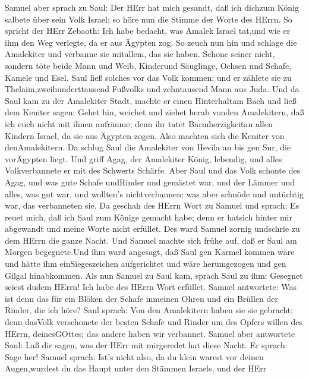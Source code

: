  Samuel aber sprach zu Saul: Der HErr hat mich gesandt, daß
ich dichzum König salbete über sein Volk Israel; so höre nun die Stimme
der Worte des HErrn.  So spricht der HErr Zebaoth: Ich habe
bedacht, was Amalek Israel tat,und wie er ihm den Weg verlegte, da er
aus Ägypten zog.  So zeuch nun hin und schlage die
Amalekiter und verbanne sie mitallem, das sie haben. Schone seiner
nicht, sondern töte beide Mann und Weib, Kinderund Säuglinge, Ochsen und
Schafe, Kamele und Esel.  Saul ließ solches vor das Volk
kommen; und er zählete sie zu Thelaim,zweihunderttausend Fußvolks und
zehntausend Mann aus Juda.  Und da Saul kam zu der
Amalekiter Stadt, machte er einen Hinterhaltam Bach  und
ließ dem Keniter sagen: Gehet hin, weichet und ziehet herab vonden
Amalekitern, daß ich euch nicht mit ihnen aufräume; denn ihr tatet
Barmherzigkeitan allen Kindern Israel, da sie aus Ägypten zogen. Also
machten sich die Keniter von denAmalekitern.  Da schlug Saul
die Amalekiter von Hevila an bis gen Sur, die vorÄgypten liegt.
 Und griff Agag, der Amalekiter König, lebendig, und alles
Volkverbannete er mit des Schwerts Schärfe.  Aber Saul und
das Volk schonte des Agag, und was gute Schafe undRinder und gemästet
war, und der Lämmer und alles, was gut war, und wollten's
nichtverbannen; was aber schnöde und untüchtig war, das verbanneten sie.
 Da geschah des HErrn Wort zu Samuel und sprach:
 Es reuet mich, daß ich Saul zum Könige gemacht habe; denn
er hatsich hinter mir abgewandt und meine Worte nicht erfüllet. Des ward
Samuel zornig undschrie zu dem HErrn die ganze Nacht.  Und
Samuel machte sich frühe auf, daß er Saul am Morgen begegnete.Und ihm
ward angesagt, daß Saul gen Karmel kommen wäre und hätte ihm
einSiegeszeichen aufgerichtet und wäre herumgezogen und gen Gilgal
hinabkommen.  Als nun Samuel zu Saul kam, sprach Saul zu
ihm: Gesegnet seiest dudem HErrn! Ich habe des HErrn Wort erfüllet.
 Samuel antwortete: Was ist denn das für ein Blöken der
Schafe inmeinen Ohren und ein Brüllen der Rinder, die ich höre?
 Saul sprach: Von den Amalekitern haben sie sie gebracht;
denn dasVolk verschonete der besten Schafe und Rinder um des Opfers
willen des HErrn, deinesGOttes; das andere haben wir verbannet.
 Samuel aber antwortete Saul: Laß dir sagen, was der HErr
mit mirgeredet hat diese Nacht. Er sprach: Sage her! 
Samuel sprach: Ist's nicht also, da du klein warest vor deinen
Augen,wurdest du das Haupt unter den Stämmen Israels, und der HErr
